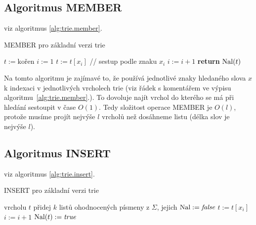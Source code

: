 \subsection{Algoritmus MEMBER}

viz algoritmus \ref{alg:trie.member}.

\begin{algorithm}[!htb]
\caption{MEMBER pro základní verzi trie}
\label{alg:trie.member}
\begin{algorithmic}
\STATE {}
\STATE $t := \text{kořen}$
\STATE $i := 1$
        \STATE $t := t[x_i]$ // sestup podle znaku $x_i$
        \STATE $i := i + 1$
\ENDWHILE
\STATE {}
\STATE \textbf{return} $\textrm{Nal}(t)$
\end{algorithmic}
\end{algorithm}

Na tomto algoritmu je zajímavé to, že používá jednotlivé znaky hledaného
slova $x$ k indexaci v jednotlivých vrcholech trie (viz řádek s
komentářem ve výpisu algoritmu~\ref{alg:trie.member}.). To dovoluje najít
vrchol do kterého se má při hledání sestoupit v čase $O(1)$. Tedy
složitost operace MEMBER je $O(l)$, protože musíme projít nejvýše $l$
vrcholů než dosáhneme listu (délka slov je nejvýše $l$).

\subsection{Algoritmus INSERT}

viz algoritmus \ref{alg:trie.insert}.

\begin{algorithm}[!htb]
\caption{INSERT pro základní verzi trie}
\label{alg:trie.insert}
\begin{algorithmic}
\STATE {}
                \STATE vrcholu $t$ přidej $k$ listů ohodnocených
                písmeny z $\Sigma$, jejich $\textrm{Nal} := \textit{false}$
                \STATE $t := t[x_i]$
                \STATE $i := i + 1$
        \ENDWHILE
        \STATE $\textrm{Nal}(t) := \textit{true}$
\ENDIF
\end{algorithmic}
\end{algorithm}

